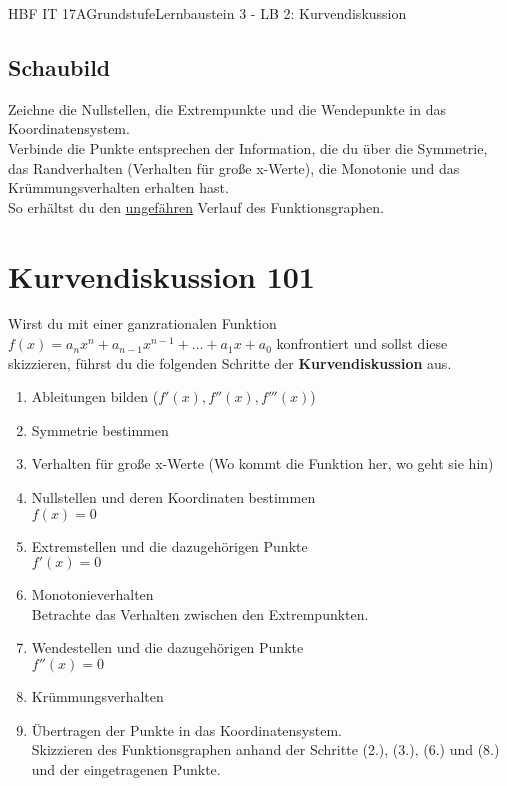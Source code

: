 \documentclass[11pt,twocolumn,oneside,openany,headings=optiontotoc,11pt,numbers=noenddot]{article}
\begin{document}
\begin{worksheet}{HBF IT 17A}{Grundstufe}{Lernbaustein 3 - LB 2: Kurvendiskussion}
		\subsection*{Schaubild} Zeichne die Nullstellen, die Extrempunkte und die Wendepunkte in das Koordinatensystem.\\
		Verbinde die Punkte entsprechen der Information, die du über die Symmetrie, das Randverhalten (Verhalten für große x-Werte), die Monotonie und das Krümmungsverhalten erhalten hast.\\
		So erhältst du den \underline{ungefähren} Verlauf des Funktionsgraphen.
		\section{Kurvendiskussion 101}
		Wirst du mit einer ganzrationalen Funktion \(f(x) = a_nx^n + a_{n-1}x^{n-1} +\ldots + a_1x +a_0\) konfrontiert und sollst diese skizzieren, führst du die folgenden Schritte der \textbf{Kurvendiskussion} aus.\\
		\begin{enumerate}
			\item Ableitungen bilden (\(f'(x), f''(x), f'''(x)\))
			\item Symmetrie bestimmen
			\item Verhalten für große x-Werte (\tiny{Wo kommt die Funktion her, wo geht sie hin}\normalsize)
			\item Nullstellen und deren Koordinaten bestimmen\\
			\(f(x) = 0\)
			\item Extremstellen und die dazugehörigen Punkte\\
			\(f'(x) = 0\)
			\item Monotonieverhalten\\
			Betrachte das Verhalten zwischen den Extrempunkten.
			\item Wendestellen und die dazugehörigen Punkte\\
			\(f''(x) = 0\)
			\item Krümmungsverhalten
			\item Übertragen der Punkte in das Koordinatensystem.\\
			Skizzieren des Funktionsgraphen anhand der Schritte (2.), (3.), (6.) und (8.) und der eingetragenen Punkte.
		\end{enumerate}
	\end{worksheet}
\end{document}
